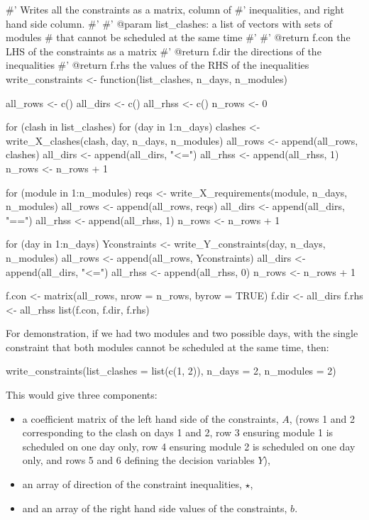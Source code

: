 \begin{Rin-no-test}
#' Writes all the constraints as a matrix, column of
#' inequalities, and right hand side column.
#'
#' @param list_clashes: a list of vectors with sets of modules
#         that cannot be scheduled at the same time
#'
#' @return f.con the LHS of the constraints as a matrix
#' @return f.dir the directions of the inequalities
#' @return f.rhs the values of the RHS of the inequalities
write_constraints <- function(list_clashes, n_days, n_modules){
  all_rows <- c()
  all_dirs <- c()
  all_rhss <- c()
  n_rows <- 0
  
  for (clash in list_clashes){
    for (day in 1:n_days){
      clashes <- write_X_clashes(clash, day, n_days, n_modules)
      all_rows <- append(all_rows, clashes)
      all_dirs <- append(all_dirs, "<=")
      all_rhss <- append(all_rhss, 1)
      n_rows <- n_rows + 1
    }
  }
  
  for (module in 1:n_modules){
    reqs <- write_X_requirements(module, n_days, n_modules)
    all_rows <- append(all_rows, reqs)
    all_dirs <- append(all_dirs, "==")
    all_rhss <- append(all_rhss, 1)
    n_rows <- n_rows + 1
  }
  
  for (day in 1:n_days){
    Yconstraints <- write_Y_constraints(day, n_days, n_modules)
    all_rows <- append(all_rows, Yconstraints)
    all_dirs <- append(all_dirs, "<=")
    all_rhss <- append(all_rhss, 0)
    n_rows <- n_rows + 1
  }
  
  f.con <- matrix(all_rows, nrow = n_rows, byrow = TRUE)
  f.dir <- all_dirs
  f.rhs <- all_rhss
  list(f.con, f.dir, f.rhs)
}
\end{Rin-no-test}

For demonstration, if we had two modules and two possible days, with the single
constraint that both modules cannot be scheduled at the same time, then:

\begin{Rin-no-test}
write_constraints(list_clashes = list(c(1, 2)),
                  n_days = 2,
                  n_modules = 2)
\end{Rin-no-test}

This would give three components:
\begin{itemize}
  \item a coefficient matrix of the left hand side of the constraints, $A$, (rows 1
  and 2 corresponding to the clash on days 1 and 2, row 3 ensuring module 1 is
  scheduled on one day only, row 4 ensuring module 2 is scheduled on one day
  only, and rows 5 and 6 defining the decision variables $Y$),
  \item an array of direction of the constraint inequalities, $\star$,
  \item and an array of the right hand side values of the constraints, $b$.
\end{itemize}

